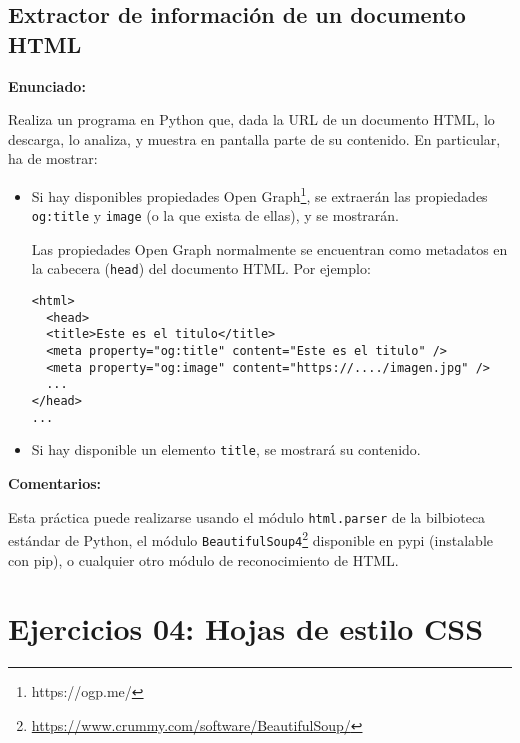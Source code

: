 \subsection{Extractor de información de un documento HTML}
\label{subsec:html-extractor}

\textbf{Enunciado:}

Realiza un programa en Python que, dada la URL de un documento HTML, lo descarga, lo analiza, y muestra en pantalla parte de su contenido. En particular, ha de mostrar:

\begin{itemize}
\item Si hay disponibles propiedades Open Graph\footnote{https://ogp.me/}, se extraerán las propiedades \texttt{og:title} y \texttt{image} (o la que exista de ellas), y se mostrarán.

  Las propiedades Open Graph normalmente se encuentran como metadatos en la cabecera (\texttt{head}) del documento HTML. Por ejemplo:

\begin{verbatim}
<html>
  <head>
  <title>Este es el titulo</title>
  <meta property="og:title" content="Este es el titulo" />
  <meta property="og:image" content="https://..../imagen.jpg" />
  ...
</head>
...
\end{verbatim}

\item Si hay disponible un elemento \texttt{title}, se mostrará su contenido.
\end{itemize}

\textbf{Comentarios:}

Esta práctica puede realizarse usando el módulo \texttt{html.parser} de la bilbioteca estándar de Python, el módulo \texttt{BeautifulSoup4}\footnote{\url{https://www.crummy.com/software/BeautifulSoup/}} disponible en pypi (instalable con pip), o cualquier otro módulo de reconocimiento de HTML.

\section{Ejercicios 04: Hojas de estilo CSS}

